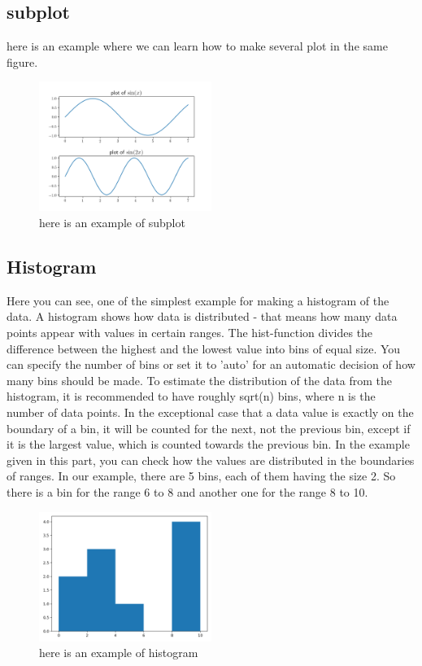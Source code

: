 \documentclass[10pt,a4paper]{article}
\begin{document}
\subsection{subplot}
here is an example where we can learn how to make several plot in the same figure.

\begin{figure}[h]\centering
\caption{here is an example of subplot}
\includegraphics[width=0.5\textwidth]{subplot.png}
\end{figure}


\subsection{Histogram}
Here you can see, one of the simplest example for making a histogram of the data. 
A histogram shows how data is distributed - that means how many  data points appear with values in certain ranges.
The hist-function divides the difference between the highest and the lowest value into bins of equal size. You can specify the number of bins or set it to 'auto' for an automatic decision of how many bins should be made.
To estimate the distribution of the data from the histogram, it is recommended to have roughly sqrt(n)
 bins, where n is the number of data points.
 In the exceptional case that a data value is exactly on the boundary of a bin, it will be counted for the next, not the previous bin, except if it is the largest value, which is counted towards the previous bin. In the example given in this part, you can check how the values are distributed in the boundaries of ranges. 
 In our example, there are 5 bins, each of them having the size 2. So there is a bin for the range 6 to 8 and another one for the range 8 to 10.

\begin{figure}[h]\centering
\caption{here is an example of histogram}
\includegraphics[width=0.5\textwidth]{histogram.png}
\end{figure}
\end{document}
